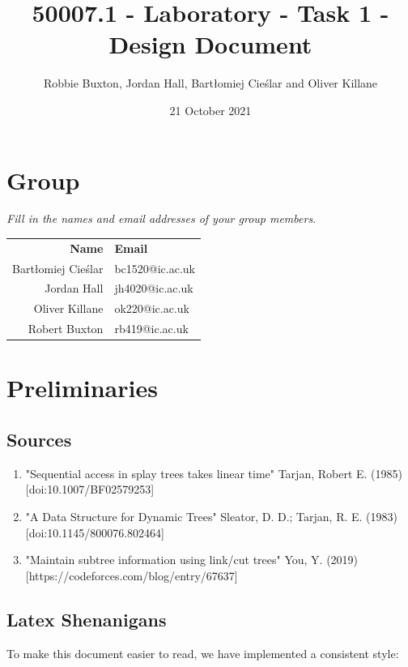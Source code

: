 \documentclass{report}
\title{50007.1 - Laboratory - Task 1 - Design Document}
\author{Robbie Buxton, Jordan Hall, Bartłomiej Cieślar and Oliver Killane}
\date{21 October 2021}
\newcommand{\question}[1]{\textit{#1} \\ }
\begin{document}
    \maketitle

    
    \section*{Group}
        \question{Fill in the names and email addresses of your group members.}
        \begin{center}
            \begin{tabular}{r l}
                \textbf{Name} & \textbf{Email} \\
                Bartłomiej Cieślar & bc1520@ic.ac.uk \\
                Jordan Hall & jh4020@ic.ac.uk \\
                Oliver Killane & ok220@ic.ac.uk \\
                Robert Buxton & rb419@ic.ac.uk \\
            \end{tabular}
        \end{center}

    \section*{Preliminaries}
        \subsection*{Sources}
        \begin{enumerate}
            \item "Sequential access in splay trees takes linear time" Tarjan, Robert E. (1985) [doi:10.1007/BF02579253]
            \item "A Data Structure for Dynamic Trees" Sleator, D. D.; Tarjan, R. E. (1983) [doi:10.1145/800076.802464]
            \item "Maintain subtree information using link/cut trees" You, Y. (2019) [https://codeforces.com/blog/entry/67637]
        \end{enumerate}
        \subsection*{Latex Shenanigans}
            To make this document easier to read, we have implemented a consistent style:
\end{document}
